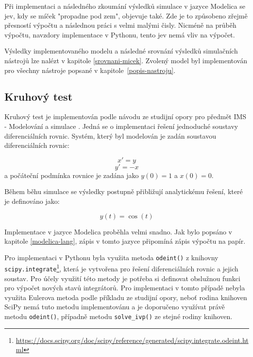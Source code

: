 Při implementaci a následného zkoumání výsledků simulace v jazyce Modelica se jev, kdy se míček "propadne pod zem", objevuje také. Zde je to způsobeno zřejmě přesností výpočtu a následnou práci s velmi malými čisly. Nicméně na průběh výpočtu, navzdory implementace v Pythonu, tento jev nemá vliv na výpočet.

Výsledky implementovaného modelu a následné srovnání výsledků simulačních nástrojů lze nalézt v kapitole \ref{srovnani-micek}.
Zvolený model byl implementován pro všechny nástroje popsané v kapitole~\ref{popis-nastroju}.

\subsection{Kruhový test}
\label{kruhovy-test}

Kruhový test je implementován podle návodu ze studijní opory pro předmět IMS - Modelování a simulace \cite{IMS-skripta}. Jedná se o implementaci řešení jednoduché soustavy diferenciálních rovnic. Systém, který byl modelován je zadán soustavou diferenciálních rovnic:

\begin{equation}
   x' = y
\end{equation}
\begin{equation}
    y' = -x
\end{equation}
a počáteční podmínka rovnice je zadána jako $y(0) = 1$ a $x(0) = 0$.

Během běhu simulace se výsledky postupně přibližují analytickému řešení, které je definováno jako:

\begin{equation}
    y(t) = \cos(t)
\end{equation}


Implementace v jazyce Modelica proběhla velmi snadno. Jak bylo popsáno v kapitole \ref{modelica-lang}, zápis v tomto jazyce připomíná zápis výpočtu na papír. 

Pro implementaci v Pythonu byla využita metoda \texttt{odeint()} z knihovny \texttt{scipy.integrate}\footnote{\url{https://docs.scipy.org/doc/scipy/reference/generated/scipy.integrate.odeint.html}}, která je vytvořena pro řešení diferenciálních rovnic a jejich soustav. Pro účely využití této metody je potřeba si definovat obslužnou funkci pro výpočet nových stavů integrátorů. Pro implementaci v tomto případě nebyla využita Eulerova metoda podle příkladu ze studijní opory, neboť rodina knihoven SciPy nemá tuto metodu implementovánu a je doporučeno využívat právě metodu \texttt{odeint()}, případně metodu \texttt{solve\_ivp()} ze stejné rodiny knihoven.

